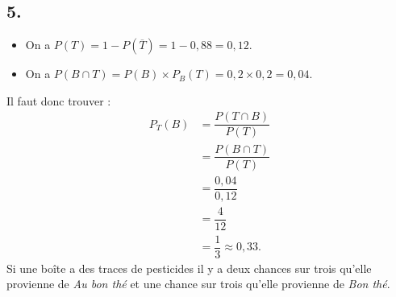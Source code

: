 \documentclass[10pt]{article}
\begin{document}
\subsection*{5.}

\begin{itemize}
    \item On a \( P(T) = 1 - P(\overline{T}) = 1 - 0{,}88 = 0{,}12 \).
    \item On a \( P(B \cap T) = P(B) \times P_B(T) = 0{,}2 \times 0{,}2 = 0{,}04 \).
\end{itemize}

Il faut donc trouver :
\begin{align*}
P_T(B) &= \dfrac{P(T \cap B)}{P(T)} \\
&= \dfrac{P(B \cap T)}{P(T)} \\
&= \dfrac{0{,}04}{0{,}12} \\
&= \dfrac{4}{12} \\
&= \dfrac{1}{3} \approx 0{,}33.
\end{align*}
Si une boîte a des traces de pesticides il y a deux chances sur trois qu'elle provienne de \textit{Au bon thé} et une chance sur trois qu'elle provienne de \textit{Bon thé}.
\end{document}
